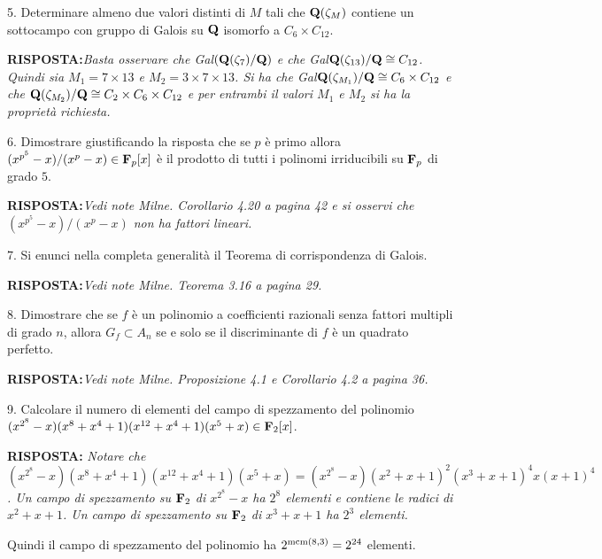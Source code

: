 \item{5.} Determinare almeno due valori distinti di $M$ tali che ${\bf Q}(\zeta_{M})$ contiene un
sottocampo con gruppo di Galois su ${\bf Q}$ isomorfo a $C_6\times C_{12}$.
\smallskip
\item{\bf RISPOSTA:}\it Basta osservare che {\rm Gal}$({\bf Q}(\zeta_7)/{\bf Q})$ e che 
{\rm Gal}${\bf Q}(\zeta_{13})/{\bf Q}\cong C_{12}$. Quindi sia $M_1=7\times13$ e $M_2=3\times7\times13$. Si ha che
{\rm Gal}${\bf Q}(\zeta_{M_1})/{\bf Q}\cong C_6\times C_{12}$ e che ${\bf Q}(\zeta_{M_2})/{\bf Q}\cong C_2\times C_6\times C_{12}$
e per entrambi il valori $M_1$ e $M_2$ si ha la propriet\`{a} richiesta.
\rm\bigskip

\item{6.} Dimostrare giustificando la risposta che se $p$ \`{e} primo allora $(x^{p^5}-x)/(x^p-x)\in{\bf F}_p[x]$ \`{e} il prodotto di tutti
i polinomi irriducibili su ${\bf F}_p$ di grado $5$.
\smallskip
\item{\bf RISPOSTA:}\it Vedi note Milne. Corollario 4.20 a pagina 42 e si osservi che $(x^{p^5}-x)/(x^p-x)$ non ha fattori
lineari.\rm\bigskip

\item{7.} Si enunci nella completa generalit\`a il Teorema di
corrispondenza di Galois.
\smallskip
\item{\bf RISPOSTA:}\it Vedi note Milne. Teorema 3.16 a pagina 29.\rm\bigskip

\item{8.} Dimostrare che se $f$ \`{e} un polinomio a coefficienti razionali senza fattori multipli di grado $n$,
allora $G_f\subset A_n$ se e solo se il discriminante di $f$ \`{e} un quadrato perfetto.
\smallskip
\item{\bf RISPOSTA:}\it Vedi note Milne. Proposizione 4.1 e Corollario 4.2 a pagina 36.
\rm\bigskip

\item{9.} Calcolare il numero di elementi del campo di spezzamento del polinomio $(x^{2^8}-x)(x^8+x^4+1)(x^{12}+x^4+1)(x^5+x)\in{\bf F}_2[x]$.
\smallskip
\item{\bf RISPOSTA:}\it
Notare che 
 $(x^{2^8}-x)(x^8+x^4+1)(x^12+x^4+1)(x^5+x)=(x^{2^8}-x)(x^2+x+1)^2(x^3+x+1)^4x(x+1)^4$.
 Un campo di spezzamento su ${\bf F}_2$ di $x^{2^8}-x$ ha $2^8$ elementi e contiene le radici di $x^2+x+1$.
 Un campo di spezzamento su ${\bf F}_2$ di $x^{3}+x+1$ ha $2^3$ elementi.

Quindi il campo di spezzamento del polinomio ha $2^{{\rm mcm}(8,3)}=2^{24}$ elementi.
\rm
 \bye
